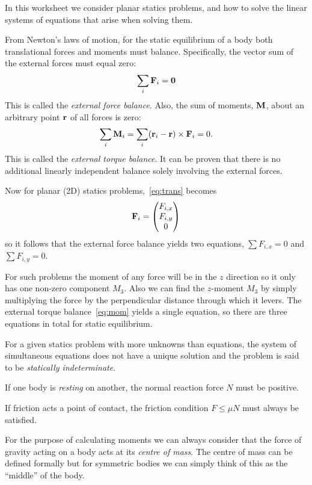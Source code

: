 In this worksheet we consider planar statics problems, and how to solve the
linear systems of equations that arise when solving them.

From Newton's laws of motion, for the static equilibrium of a body both
translational forces and moments must balance. Specifically, the vector sum of
the external forces must equal zero:
\begin{equation} \label{eq:trans}
 \sum_{i} {\bf F}_{i}= \bf{0}
\end{equation}
This is called the {\em external force balance}. Also, the sum of moments,
$\bf{M}$, about an arbitrary point ${\bf r}$ of all forces is zero:
\begin{equation} \label{eq:mom}
 \sum_{i} {\bf M}_{i}= \sum_{i} ({\bf r}_{i}-{\bf r}) \times {\bf F}_{i}= 0.
\end{equation}
This is called the {\em external torque balance}. It can be proven that there
is no additional linearly independent balance solely involving the external
forces.

Now for planar (2D) statics problems,~\eqref{eq:trans} becomes
\[
 {\bf F}_{i}=\begin{pmatrix}
         F_{i,x} \\ F_{i,y} \\ 0
        \end{pmatrix}
\]
so it follows that the external force balance yields two equations, $\sum
F_{i,x} =0$ and $\sum F_{i,y}=0$.

For such problems the moment of any force will be in the $z$ direction so it
only has one non-zero component $M_3$. Also we can find the $z$-moment $M_3$
by simply multiplying the force by the perpendicular distance through which it
levers. The external torque balance~\eqref{eq:mom} yields a single equation,
so there are three equations in total for static equilibrium.

For a given statics problem with more unknowns than equations, the system of
simultaneous equations does not have a unique solution and the problem is said
to be {\em statically indeterminate}.

If one body is {\em resting} on another, the normal reaction force $N$ must be
positive.

If friction acts a point of contact, the friction condition $F\leq \mu N$ must
always be satisfied.

For the purpose of calculating moments we can always consider that the force of
gravity acting on a body acts at its \emph{centre of mass}. The centre of mass
can be defined formally but for symmetric bodies we can simply think of this
as the ``middle'' of the body.


\clearpage
